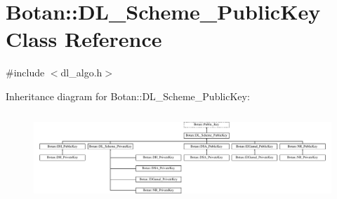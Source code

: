 \hypertarget{classBotan_1_1DL__Scheme__PublicKey}{\section{Botan\-:\-:D\-L\-\_\-\-Scheme\-\_\-\-Public\-Key Class Reference}
\label{classBotan_1_1DL__Scheme__PublicKey}
}


{\ttfamily \#include $<$dl\-\_\-algo.\-h$>$}

Inheritance diagram for Botan\-:\-:D\-L\-\_\-\-Scheme\-\_\-\-Public\-Key\-:\begin{figure}[H]
\begin{center}
\leavevmode
\includegraphics[height=3.350427cm]{classBotan_1_1DL__Scheme__PublicKey}
\end{center}
\end{figure}
